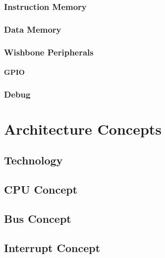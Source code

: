 \subsection{Instruction Memory}

\subsection{Data Memory}

\subsection{Wishbone Peripherals}
\subsubsection{GPIO}

\subsection{Debug}


\chapter{Architecture Concepts}



\section{Technology}
\label{sec:archtech}

\section{CPU Concept}
\label{sec:archcpu}






\section{Bus Concept}


\section{Interrupt Concept}
\label{sec:archirq}


